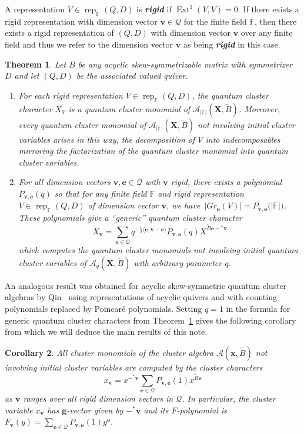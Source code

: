 \documentclass[12pt]{amsart}
\newtheorem{theorem}{Theorem}
\newtheorem{corollary}[theorem]{Corollary}
\newcommand{\bfe}{\mathbf{e}}
\newcommand{\bfg}{\mathbf{g}}
\newcommand{\bfv}{\mathbf{v}}
\newcommand{\bfx}{\mathbf{x}}
\newcommand{\bfX}{\mathbf{X}}
\newcommand{\cA}{\mathcal{A}}
\newcommand{\cQ}{\mathcal{Q}}
\newcommand{\FF}{\mathbb{F}}
\newcommand{\Ext}{\operatorname{Ext}}
\newcommand{\half}{{\frac{1}{2}}}
\newcommand{\rep}{\operatorname{rep}}
\newcommand{\newword}[1]{\textbf{\emph{#1}}}
\newenvironment{enumeratea}{\begin{enumerate}[\upshape (a)]}{\end{enumerate}}
\begin{document}
  A representation $V\in\rep_\FF(Q,D)$ is \newword{rigid} if $\Ext^1(V,V)=0$.
  If there exists a rigid representation with dimension vector $\bfv\in\cQ$ for the finite field $\FF$, then there exists a rigid representation of $(Q,D)$ with dimension vector $\bfv$ over any finite field and thus we refer to the dimension vector $\bfv$ as being \newword{rigid} in this case.
  \begin{theorem}\cite{rupel1,rupel2}
    \label{th:quantum cluster characters}
    Let $B$ be any acyclic skew-symmetrizable matrix with symmetrizer $D$ and let $(Q,D)$ be the associated valued quiver.
    \begin{enumeratea}
      \item 
        For each rigid representation $V\in\rep_\FF(Q,D)$, the quantum cluster character $X_V$ is a quantum cluster monomial of $\cA_{|\FF|}(\bfX,\widetilde{B})$.  
        Moreover, every quantum cluster monomial of $\cA_{|\FF|}(\bfX,\widetilde{B})$ not involving initial cluster variables arises in this way, the decomposition of $V$ into indecomposables mirroring the factorization of the quantum cluster monomial into quantum cluster variables.
      
      \item 
        For all dimension vectors $\bfv,\bfe\in\cQ$ with $\bfv$ rigid, there exists a polynomial $P_{\bfv,\bfe}(q)$ so that for any finite field $\FF$ and rigid representation $V\in\rep_\FF(Q,D)$ of dimension vector $\bfv$, we have~$\big|Gr_\bfe(V)\big|=P_{\bfv,\bfe}\big(|\FF|\big)$.
        These polynomials give a ``generic'' quantum cluster character 
        \[
          X_\bfv=\sum\limits_{\bfe\in\cQ} q^{-\half\langle\bfe,\bfv-\bfe\rangle}P_{\bfv,\bfe}(q)X^{\widetilde{B}\bfe-{}^*\bfv}
        \]
        which computes the quantum cluster monomials not involving initial quantum cluster variables of $\cA_q(\bfX,\widetilde{B})$ with arbitrary parameter $q$.
    \end{enumeratea}
  \end{theorem}
  An analogous result was obtained for acyclic skew-symmetric quantum cluster algebras by Qin~\cite{qin} using representations of acyclic quivers and with counting polynomials replaced by Poincar\'e polynomials.
  Setting $q=1$ in the formula for generic quantum cluster characters from Theorem~\ref{th:quantum cluster characters} gives the following corollary from which we will deduce the main results of this note.
  \begin{corollary}
    \label{cor:classical cluster characters}
    All cluster monomials of the cluster algebra $\cA(\bfx,\widetilde{B})$ not involving initial cluster variables are computed by the cluster characters
    \[
      x_\bfv
      =
      x^{-{}^*\bfv}\sum\limits_{\bfe\in\cQ} P_{\bfv,\bfe}(1)x^{\widetilde{B}\bfe}
    \]
    as $\bfv$ ranges over all rigid dimension vectors in $\cQ$.
    In particular, the cluster variable $x_\bfv$ has $\bfg$-vector given by $-{}^*\bfv$ and its $F$-polynomial is $F_\bfv(y)=\sum\limits_{\bfe\in\cQ} P_{\bfv,\bfe}(1)y^\bfe$.
  \end{corollary}
\end{document}
